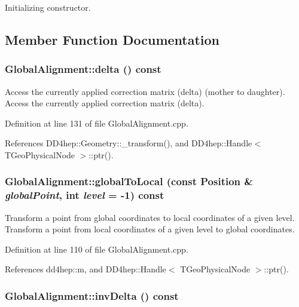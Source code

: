 Initializing constructor. 

\subsection{Member Function Documentation}
\hypertarget{class_d_d4hep_1_1_alignments_1_1_global_alignment_a3b392c1322cd9b4b9166aff9a116517c}{
\subsubsection[{delta}]{ GlobalAlignment::delta () const}}
\label{class_d_d4hep_1_1_alignments_1_1_global_alignment_a3b392c1322cd9b4b9166aff9a116517c}


Access the currently applied correction matrix (delta) (mother to daughter). Access the currently applied correction matrix (delta). 

Definition at line 131 of file GlobalAlignment.cpp.

References DD4hep::Geometry::\_\-transform(), and DD4hep::Handle$<$ TGeoPhysicalNode $>$::ptr().\hypertarget{class_d_d4hep_1_1_alignments_1_1_global_alignment_afbb2091137975e333688b024d9781d42}{
\subsubsection[{globalToLocal}]{ GlobalAlignment::globalToLocal (const {\bf Position} \& {\em globalPoint}, \/  int {\em level} = {\ttfamily -\/1}) const}}
\label{class_d_d4hep_1_1_alignments_1_1_global_alignment_afbb2091137975e333688b024d9781d42}


Transform a point from global coordinates to local coordinates of a given level. Transform a point from local coordinates of a given level to global coordinates. 

Definition at line 110 of file GlobalAlignment.cpp.

References dd4hep::m, and DD4hep::Handle$<$ TGeoPhysicalNode $>$::ptr().\hypertarget{class_d_d4hep_1_1_alignments_1_1_global_alignment_a8e320407ca494e5b3a8bfb1bb13bfad7}{
\subsubsection[{invDelta}]{ GlobalAlignment::invDelta () const}}
\label{class_d_d4hep_1_1_alignments_1_1_global_alignment_a8e320407ca494e5b3a8bfb1bb13bfad7}


